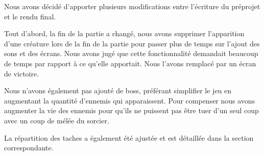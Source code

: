 Nous avons décidé d'apporter plusieurs modifications entre l'écriture du préprojet et le rendu final. 

Tout d'abord, la fin de la partie a changé, nous avons supprimer l'apparition d'une créature lors de la fin de la partie pour passer plus de temps sur l'ajout des sons et des écrans. Nous avons jugé que cette fonctionnalité demandait beaucoup de temps par rapport à ce qu'elle apportait. Nous l'avons remplacé par un écran de victoire.

Nous n'avons également pas ajouté de boss, préférant simplifier le jeu en augmentant la quantité d'ennemis qui apparaissent. Pour compenser nous avons augmenter la vie des ennemis pour qu'ils ne puissent pas être tuer d'un seul coup avec un coup de mélée du sorcier.

La répartition des taches a également été ajustée et est détaillée dans la section correspondante.

